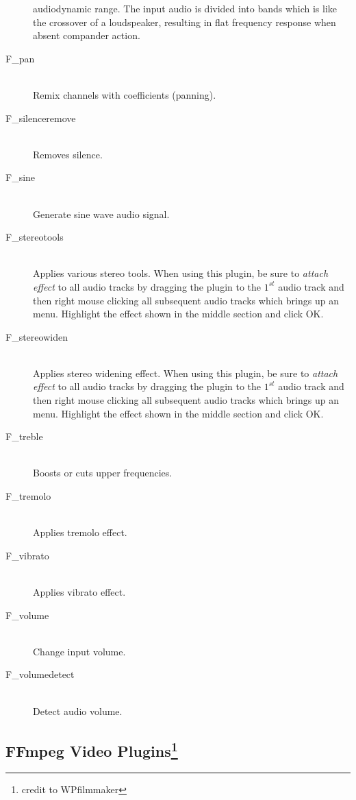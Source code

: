 \begin{description}
  audiodynamic range. The input audio is divided into bands which is
  like the crossover of a loudspeaker, resulting in flat frequency
  response when absent compander action.
\item [F\_pan]~\\Remix channels with coefficients (panning).
\item [F\_silenceremove]~\\Removes silence.
\item [F\_sine]~\\Generate sine wave audio signal.
\item [F\_stereotools]~\\Applies various stereo tools. When
  using this plugin, be sure to \textit{attach effect} to all audio
  tracks by dragging the plugin to the $1^{st}$ audio track and then
  right mouse clicking all subsequent audio tracks which brings up an
  menu. Highlight the effect shown in the middle section and click OK.
\item [F\_stereowiden]~\\Applies stereo widening effect. When
  using this plugin, be sure to \textit{attach effect} to all audio
  tracks by dragging the plugin to the $1^{st}$ audio track and then
  right mouse clicking all subsequent audio tracks which brings up an
  menu. Highlight the effect shown in the middle section and click OK.
\item [F\_treble]~\\Boosts or cuts upper frequencies.
\item [F\_tremolo]~\\Applies tremolo effect.
\item [F\_vibrato]~\\Applies vibrato effect.
\item [F\_volume]~\\Change input volume.
\item [F\_volumedetect]~\\Detect audio volume.
\end{description}

\subsection{FFmpeg Video Plugins\protect\footnote{credit to WPfilmmaker}}%
\label{sub:ffmpeg_video_plugins}

